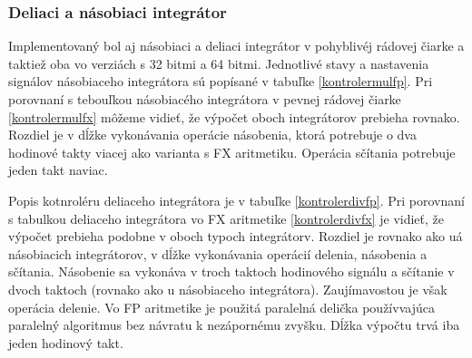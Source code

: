 \subsubsection*{Deliaci a násobiaci integrátor}
Implementovaný bol aj násobiaci a deliaci integrátor v pohyblivéj rádovej čiarke a taktiež oba vo verziách s 32 bitmi a 64 bitmi. Jednotlivé stavy a nastavenia signálov násobiaceho integrátora sú popísané v tabuľke \ref{kontrolermulfp}. Pri porovnaní s tebouľkou násobiacého integrátora v pevnej rádovej čiarke \ref{kontrolermulfx} môžeme vidieť, že výpočet oboch integrátorov prebieha rovnako. Rozdiel je v dĺžke vykonávania operácie násobenia, ktorá potrebuje o dva hodinové takty viacej ako varianta s FX aritmetiku. Operácia sčítania potrebuje jeden takt naviac.

Popis kotnroléru deliaceho integrátora je v tabuľke \ref{kontrolerdivfp}. Pri porovnaní s tabulkou deliaceho integrátora vo FX aritmetike \ref{kontrolerdivfx} je vidieť, že výpočet prebieha podobne v oboch typoch integrátorv. Rozdiel je rovnako ako uá násobiacich integrátorov, v dĺžke vykonávania operácií delenia, násobenia a sčítania. Násobenie sa vykonáva v troch taktoch hodinového signálu a sčítanie v dvoch taktoch (rovnako ako u násobiaceho integrátora). Zaujímavostou je však operácia delenie. Vo FP aritmetike je použitá paralelná delička používvajúca paralelný algoritmus bez návratu k nezápornému zvyšku. Dĺžka výpočtu trvá iba jeden hodinový takt.







